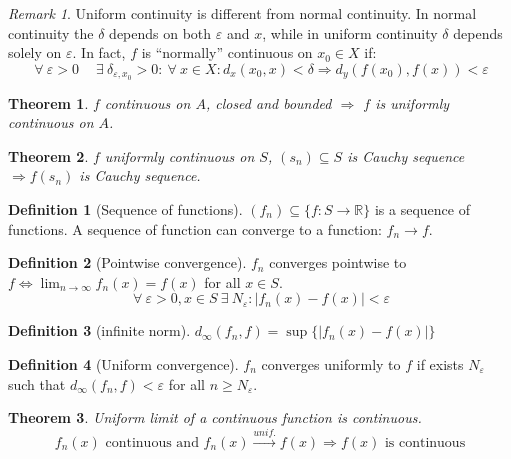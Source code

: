 \documentclass{article}
\newcommand{\DS}{\displaystyle}
\newcommand{\abs}[1]{\left|#1\right|}
\newcommand{\Ar}{\Rightarrow}
\newcommand{\f}[3]{#1 : #2 \rightarrow #3}
\newcommand{\limn}{\lim_{n \to \infty}}
\newcommand{\tounif}{\xrightarrow{unif.}}
\theoremstyle{definition}
\newtheorem{definition}{Definition}[section]
\theoremstyle{definition}
\theoremstyle{plain}
\newtheorem{theorem}{Theorem}[section]
\theoremstyle{plain}
\theoremstyle{plain}
\theoremstyle{plain}
\theoremstyle{definition}
\theoremstyle{remark}
\theoremstyle{remark}
\theoremstyle{remark}
\theoremstyle{remark}
\newtheorem*{remark}{Remark}
\newcommand{\R}{\mathbb{R}}
\newcommand{\ForAll}{\ \forall \ }
\newcommand{\Exists}{\ \exists \ }
\newcommand{\E}{\varepsilon}
\begin{document}
\begin{remark}
  Uniform continuity is different from normal continuity. In normal continuity the $\delta$ depends on both $\E$ and $x$, while in uniform continuity $\delta$ depends solely on $\E$. In fact, $f$ is ``normally'' continuous on $x_0 \in X$ if:
  \[
  \ForAll \E > 0 \quad \Exists \delta_{\E,x_0} > 0 : \ForAll x \in X :
  d_x(x_0,x) < \delta \Ar d_y(f(x_0),f(x)) < \E
  \]
\end{remark}

\begin{theorem}
  $f$ continuous on $A$, closed and bounded $\Ar$ $f$ is uniformly continuous on $A$.
\end{theorem}


\begin{theorem}
  $f$ uniformly continuous on $S$, $(s_n) \subseteq S$ is Cauchy sequence $\Ar f(s_n)$ is Cauchy sequence.
\end{theorem}




\begin{definition}[Sequence of functions]
  $(f_n) \subseteq \{ \f{f}{S}{\R} \}$ is a sequence of functions. A sequence of function can converge to a function: $f_n \to f$.
\end{definition}



\begin{definition}[Pointwise convergence]
  $f_n$ converges pointwise to $f \iff \DS \limn{f_n(x)} = f(x)$ for all $x \in S$.
  \[
  \ForAll \E > 0, x \in S \Exists N_\E : \abs{f_n(x) - f(x)} < \E
  \]
\end{definition}



\begin{definition}[infinite norm]
  $d_\infty(f_n,f) = \sup \{ \abs{f_n(x) - f(x)} \}$
\end{definition}


\begin{definition}[Uniform convergence]
  $f_n$ converges uniformly to $f$ if exists $N_\E$ such that $d_\infty(f_n,f) < \E$ for all $n \geq N_\E$.
\end{definition}



\begin{theorem}
  Uniform limit of a continuous function is continuous.
  \[
  f_n(x) \text{ continuous and } f_n(x) \tounif f(x) \Ar f(x) \text{ is continuous}
  \]
\end{theorem}
\end{document}
